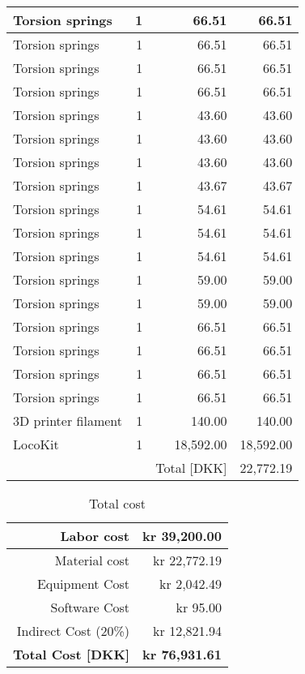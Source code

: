 \begin{table}[htbp]
\begin{tabular}{l|r|r|r}
Torsion springs & 1 & 66.51 & 66.51 \\ \hline
Torsion springs & 1 & 66.51 & 66.51 \\ \hline
Torsion springs & 1 & 66.51 & 66.51 \\ \hline
Torsion springs & 1 & 66.51 & 66.51 \\ \hline
Torsion springs & 1 & 43.60 & 43.60 \\ \hline
Torsion springs & 1 & 43.60 & 43.60 \\ \hline
Torsion springs & 1 & 43.60 & 43.60 \\ \hline
Torsion springs & 1 & 43.67 & 43.67 \\ \hline
Torsion springs & 1 & 54.61 & 54.61 \\ \hline
Torsion springs & 1 & 54.61 & 54.61 \\ \hline
Torsion springs & 1 & 54.61 & 54.61 \\ \hline
Torsion springs & 1 & 59.00 & 59.00 \\ \hline
Torsion springs & 1 & 59.00 & 59.00 \\ \hline
Torsion springs & 1 & 66.51 & 66.51 \\ \hline
Torsion springs & 1 & 66.51 & 66.51 \\ \hline
Torsion springs & 1 & 66.51 & 66.51 \\ \hline
Torsion springs & 1 & 66.51 & 66.51 \\ \hline
3D printer filament & 1 & 140.00 & 140.00 \\ \hline
LocoKit  & 1 & 18,592.00 & 18,592.00 \\ \hline
\multicolumn{2}{l}{} & Total [DKK] & 22,772.19 \\
\end{tabular}
\label{tab:material_cost}
\end{table}


\begin{table}[htbp]
\caption{Total cost}
\begin{center}
\begin{tabular}{r|r}
Labor cost & kr 39,200.00 \\ \hline
Material cost & kr 22,772.19 \\ \hline
Equipment Cost & kr 2,042.49 \\ \hline
Software Cost & kr 95.00 \\ \hline
Indirect Cost (20\%) & kr 12,821.94 \\ \hhline{=|=}
\textbf{Total Cost [DKK]} & \textbf{kr 76,931.61} \\ 
\end{tabular}
\end{center}
\label{tab:total_cost}
\end{table}


